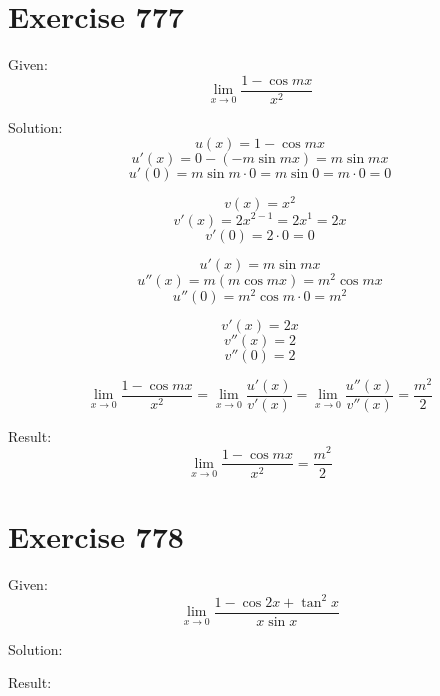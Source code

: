 \documentclass[a4paper, 10pt]{scrartcl}
\begin{document}
\section{Exercise 777}

Given:
\[
\lim_{x\to 0}{\frac{1 - \cos{mx}}{x^{2}}}
\]

Solution:
\[
u(x) = 1 - \cos{mx}
\]
\[
u'(x) = 0 - (-m\sin{mx}) = m\sin{mx}
\]
\[
u'(0) = m\sin{m\cdot 0} = m\sin{0} = m\cdot 0 = 0
\]

\[
v(x) = x^{2}
\]
\[
v'(x) = 2x^{2 - 1} = 2x^{1} = 2x
\]
\[
v'(0) = 2\cdot 0 = 0
\]

\[
u'(x) = m\sin{mx}
\]
\[
u''(x) = m(m\cos{mx}) = m^{2}\cos{mx}
\]
\[
u''(0) = m^{2}\cos{m\cdot 0} = m^{2}
\]

\[
v'(x) = 2x
\]
\[
v''(x) = 2
\]
\[
v''(0) = 2
\]

\[
\lim_{x\to 0}{\frac{1 - \cos{mx}}{x^{2}}} = \lim_{x\to 0}{\frac{u'(x)}{v'(x)}} = \lim_{x\to 0}{\frac{u''(x)}{v''(x)}}
= \frac{m^{2}}{2}
\]

Result:
\[
\lim_{x\to 0}{\frac{1 - \cos{mx}}{x^{2}}} = \frac{m^{2}}{2}
\]

\section{Exercise 778}

Given:
\[
\lim_{x\to 0}{\frac{1 - \cos{2x} + \tan^{2}{x}}{x\sin{x}}}
\]

Solution:

Result:
\end{document}
